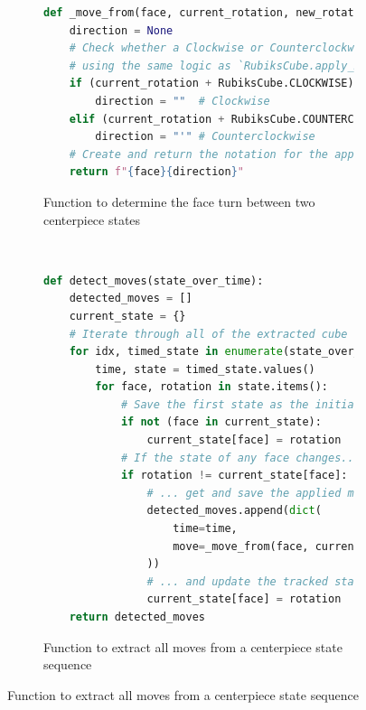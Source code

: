 \begin{figure}[h]
\caption{Code to extract move sequences from state sequences}
\label{fig:code-extract-moves-from-state}
\begin{subfigure}{\textwidth}
\caption{Function to determine the face turn between two centerpiece states}
\label{fig:code-move-from}
\begin{lstlisting}[language=Python]
def _move_from(face, current_rotation, new_rotation):
    direction = None
    # Check whether a Clockwise or Counterclockwise turn occurred 
    # using the same logic as `RubiksCube.apply_move`
    if (current_rotation + RubiksCube.CLOCKWISE) % 4 == new_rotation:
        direction = ""  # Clockwise
    elif (current_rotation + RubiksCube.COUNTERCLOCKWISE) % 4 == new_rotation:
        direction = "'" # Counterclockwise
    # Create and return the notation for the applied face turn
    return f"{face}{direction}"
\end{lstlisting}
\vspace*{2mm}
\end{subfigure}\\
\begin{subfigure}{\textwidth}
\caption{Function to extract all moves from a centerpiece state sequence}
\label{fig:code-detect-moves}
\begin{lstlisting}[language=Python, firstnumber=last]
def detect_moves(state_over_time):
    detected_moves = []
    current_state = {}
    # Iterate through all of the extracted cube states
    for idx, timed_state in enumerate(state_over_time):
        time, state = timed_state.values()
        for face, rotation in state.items():
            # Save the first state as the initial state
            if not (face in current_state):
                current_state[face] = rotation
            # If the state of any face changes...
            if rotation != current_state[face]:
                # ... get and save the applied move with its timestamp...
                detected_moves.append(dict(
                    time=time,
                    move=_move_from(face, current_state[face], rotation)
                ))
                # ... and update the tracked state based on the new move.
                current_state[face] = rotation
    return detected_moves
\end{lstlisting}
\end{subfigure}

\end{figure}

\newpage

